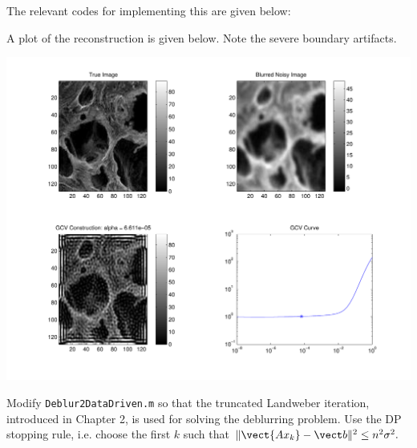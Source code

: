\documentclass{homework}
\begin{document}
\begin{solution}
The relevant codes for implementing this are given below:
   

  A plot of the reconstruction is given below.  Note the severe boundary artifacts.
  \begin{center}
    \includegraphics[width=.9\textwidth]{boundary_bad.pdf}
  \end{center}  
\end{solution}

\begin{longproblem}
Modify \texttt{Deblur2DataDriven.m} so that the truncated Landweber iteration, introduced in Chapter 2, is used for solving the deblurring problem.  Use the DP stopping rule, i.e. choose the first $k$ such that $\|\vect{Ax_k} - \vect b\|^2 \le n^2\sigma^2.$
\end{longproblem}
\end{document}
